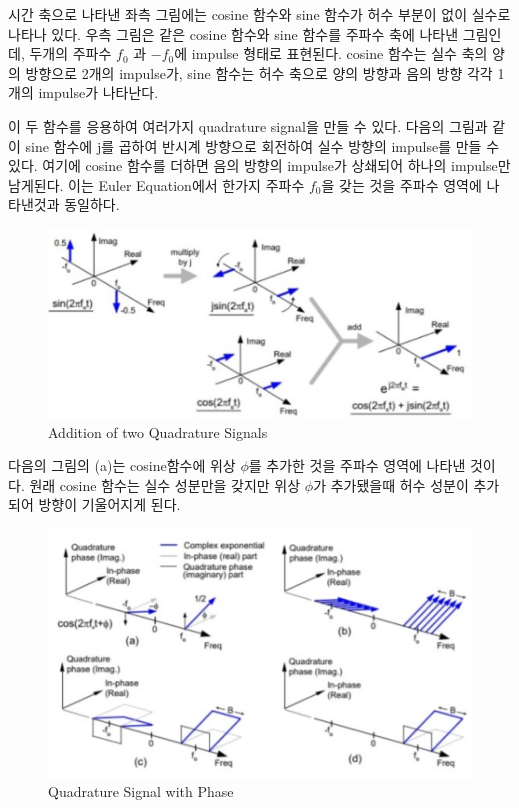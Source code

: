     시간 축으로 나타낸 좌측 그림에는 cosine 함수와 sine 함수가 허수 부분이 없이 실수로 나타나 있다. 우측 그림은 같은 cosine 함수와 sine 함수를 주파수 축에 나타낸 그림인데, 두개의 주파수 $f_0$ 과 $-f_0$에 impulse 형태로 표현된다. cosine 함수는 실수 축의 양의 방향으로 2개의 impulse가, sine 함수는 허수 축으로 양의 방향과 음의 방향 각각 1개의 impulse가 나타난다.

    이 두 함수를 응용하여 여러가지 quadrature signal을 만들 수 있다. 다음의 그림과 같이 sine 함수에 j를 곱하여 반시계 방향으로 회전하여 실수 방향의 impulse를 만들 수 있다. 여기에 cosine 함수를 더하면 음의 방향의 impulse가 상쇄되어 하나의 impulse만 남게된다. 이는 Euler Equation에서 한가지 주파수 $f_0$을 갖는 것을 주파수 영역에 나타낸것과 동일하다.
    
    \vspace{-4mm}  
    \begin{figure}[!h]\centering
		\includegraphics[width=.75\textwidth]{image/week02/2-2-2.png}
		\caption{\small Addition of two Quadrature Signals}
		\vspace{-10pt}
    \end{figure}
    
    다음의 그림의 (a)는 cosine함수에 위상 $\phi$를 추가한 것을 주파수 영역에 나타낸 것이다. 원래 cosine 함수는 실수 성분만을 갖지만 위상 $\phi$가 추가됐을때 허수 성분이 추가되어 방향이 기울어지게 된다.
    
    \vspace{-4mm}  
    \begin{figure}[!h]\centering
		\includegraphics[width=.75\textwidth]{image/week02/2-2-3.png}
		\caption{\small Quadrature Signal with Phase}
		\vspace{-10pt}
    \end{figure}
    
